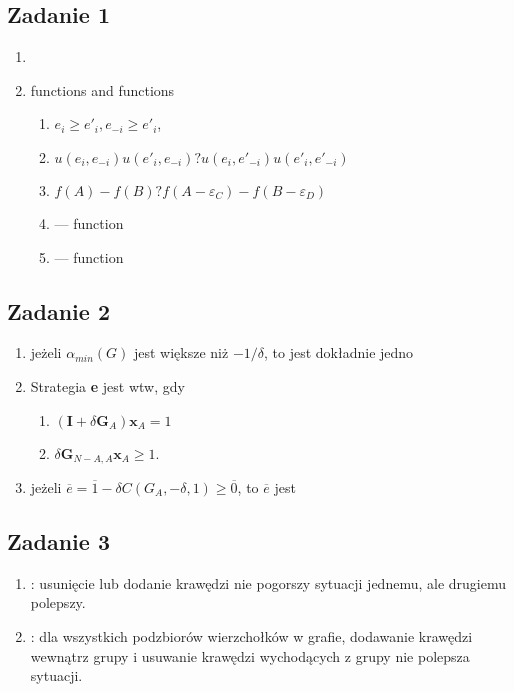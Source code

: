 \subsection{Zadanie 1}
\begin{enumerate}
    \item
    \item
         functions and  functions
        \begin{enumerate}
            \item
                $e_i \geq e'_i, e_{-i} \geq e'_i$,
            \item
                $ u(e_i, e_{-i}) u(e'_i, e_{-i}) ?  u(e_i, e'_{-i}) u(e'_i, e'_{-i}) $
            \item
                $ f(A) - f(B) ?  f(A - \varepsilon_C) - f(B - \varepsilon_D) $
            \item
                --- function
            \item
                --- function
        \end{enumerate}
\end{enumerate}

\subsection{Zadanie 2}
\begin{enumerate}
  \item
    jeżeli $\alpha_{min}(G)$ jest większe niż $-1/\delta$, to jest dokładnie jedno
  \item Strategia \textbf{e} jest  wtw, gdy
    \begin{enumerate}
      \item $ (\textbf{I} + \delta \textbf{G}_{A})\textbf{x}_{A} = 1$
      \item $ \delta\textbf{G}_{N-A,A}\textbf{x}_A \geq 1.$
    \end{enumerate}
  \item
    jeżeli $\overline{e} = \overline{1} - \delta C(G_A, -\delta, 1) \geq \overline{0}$,
    to $\overline{e}$  jest 
\end{enumerate}

\subsection{Zadanie 3}
\begin{enumerate}
 \item
     : usunięcie lub dodanie krawędzi nie pogorszy
        sytuacji jednemu, ale drugiemu polepszy.
 \item
     : dla wszystkich podzbiorów wierzchołków w
        grafie, dodawanie krawędzi wewnątrz grupy i usuwanie krawędzi
        wychodących z grupy nie polepsza sytuacji.
\end{enumerate}

